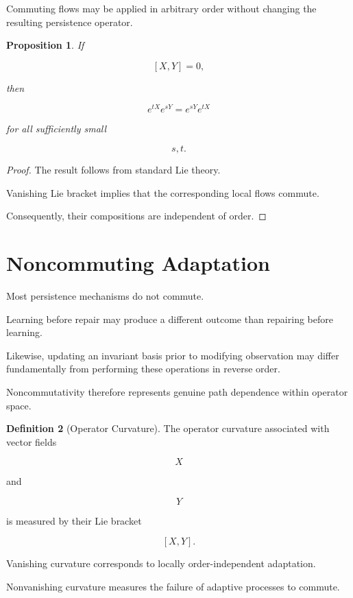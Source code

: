 \documentclass[11pt]{book}
\numberwithin{equation}{chapter}
\theoremstyle{definition}
\newtheorem{definition}{Definition}[chapter]
\theoremstyle{plain}
\newtheorem{proposition}[definition]{Proposition}
\begin{document}
Commuting flows may be applied in arbitrary order without changing the
resulting persistence operator.

\begin{proposition}

If

\[
[X,Y]=0,
\]

then

\[
e^{tX}e^{sY}
=
e^{sY}e^{tX}
\]

for all sufficiently small

\[
s,t.
\]

\end{proposition}

\begin{proof}

The result follows from standard Lie theory.

Vanishing Lie bracket implies that the corresponding local flows
commute.

Consequently, their compositions are independent of order.

\end{proof}

\section{Noncommuting Adaptation}

Most persistence mechanisms do not commute.

Learning before repair may produce a different outcome than repairing
before learning.

Likewise, updating an invariant basis prior to modifying observation
may differ fundamentally from performing these operations in reverse
order.

Noncommutativity therefore represents genuine path dependence within
operator space.

\begin{definition}[Operator Curvature]

The operator curvature associated with vector fields

\[
X
\]

and

\[
Y
\]

is measured by their Lie bracket

\[
[X,Y].
\]

Vanishing curvature corresponds to locally order-independent
adaptation.

Nonvanishing curvature measures the failure of adaptive processes to
commute.

\end{definition}
\end{document}
